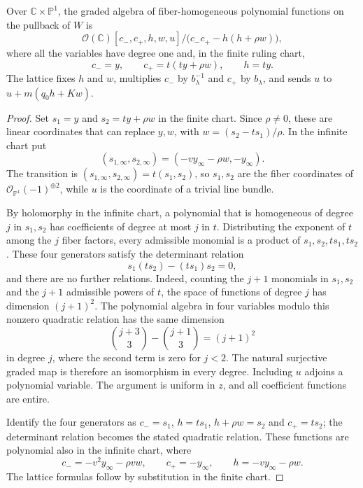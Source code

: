 \begin{lemma}\label{lem:elliptic-extension-fiber-ring}
Over $\mathbb C\times\mathbb P^1$, the graded algebra of fiber-homogeneous polynomial functions on the pullback of $W$ is
\[
 \mathcal O(\mathbb C)
 [c_-,c_+,h,w,u]/\bigl(c_-c_+-h(h+\rho w)\bigr),
\]
where all the variables have degree one and, in the finite ruling chart,
\[
 c_-=y,\qquad c_+=t(ty+\rho w),\qquad h=ty.
\]
The lattice fixes $h$ and $w$, multiplies $c_-$ by $b_\lambda^{-1}$ and $c_+$ by $b_\lambda$, and sends $u$ to $u+m(q_0h+Kw)$.
\end{lemma}
\begin{proof}
Set $s_1=y$ and $s_2=ty+\rho w$ in the finite chart. Since $\rho\ne0$, these are linear coordinates that can replace $y,w$, with $w=(s_2-ts_1)/\rho$. In the infinite chart put
\[
 (s_{1,\infty},s_{2,\infty})
       =(-v y_\infty-\rho w,-y_\infty).
\]
The transition is $(s_{1,\infty},s_{2,\infty})=t(s_1,s_2)$, so $s_1,s_2$ are the fiber coordinates of $\mathcal O_{\mathbb P^1}(-1)^{\oplus2}$, while $u$ is the coordinate of a trivial line bundle.

By holomorphy in the infinite chart, a polynomial that is homogeneous of degree $j$ in $s_1,s_2$ has coefficients of degree at most $j$ in $t$. Distributing the exponent of $t$ among the $j$ fiber factors, every admissible monomial is a product of $s_1,s_2,ts_1,ts_2$. These four generators satisfy the determinant relation
\[
 s_1(ts_2)-(ts_1)s_2=0,
\]
and there are no further relations. Indeed, counting the $j+1$ monomials in $s_1,s_2$ and the $j+1$ admissible powers of $t$, the space of functions of degree $j$ has dimension $(j+1)^2$. The polynomial algebra in four variables modulo this nonzero quadratic relation has the same dimension
\[
 \binom{j+3}{3}-\binom{j+1}{3}=(j+1)^2
\]
in degree $j$, where the second term is zero for $j<2$. The natural surjective graded map is therefore an isomorphism in every degree. Including $u$ adjoins a polynomial variable. The argument is uniform in $z$, and all coefficient functions are entire.

Identify the four generators as $c_-=s_1$, $h=ts_1$, $h+\rho w=s_2$ and $c_+=ts_2$; the determinant relation becomes the stated quadratic relation. These functions are polynomial also in the infinite chart, where
\[
 c_-=-v^2y_\infty-\rho v w,\qquad
 c_+=-y_\infty,\qquad h=-v y_\infty-\rho w.
\]
The lattice formulas follow by substitution in the finite chart.
\end{proof}

